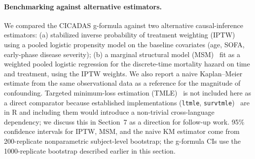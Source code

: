 \paragraph{Benchmarking against alternative estimators.}
We compared the CICADAS g-formula against two alternative causal-inference estimators:
(a) stabilized inverse probability of treatment weighting (IPTW)~\cite{robins2000marginal,cole2008constructing} using a pooled logistic
propensity model on the baseline covariates (age, SOFA, early-phase disease severity);
(b) a marginal structural model (MSM)~\cite{robins2000marginal,hernan2000marginal} fit as a weighted pooled logistic regression for
the discrete-time mortality hazard on time and treatment, using the IPTW weights.
We also report a naive Kaplan--Meier estimate from the same observational data as a
reference for the magnitude of confounding. Targeted minimum-loss estimation (TMLE)~\cite{vanderlaan2006tmle,vanderlaan2011targeted} is
not included here as a direct comparator because established implementations
(\texttt{ltmle}, \texttt{survtmle})~\cite{lendle2017ltmle,benkeser2017survtmle} are in R and including them would introduce a
non-trivial cross-language dependency; we discuss this in Section~7 as a direction for
follow-up work. 95\% confidence intervals for IPTW, MSM, and the naive KM estimator come
from 200-replicate nonparametric subject-level bootstrap; the g-formula CIs use the
1000-replicate bootstrap described earlier in this section.
